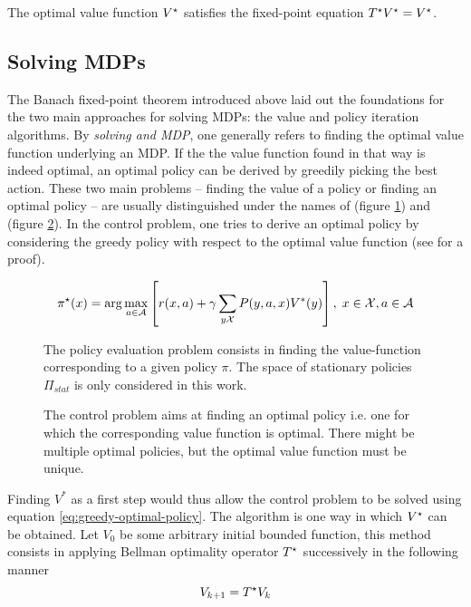 The optimal value function $V^\star$ satisfies the fixed-point equation
$T^\star V^\star = V^\star$.

\subsection{Solving MDPs}

The Banach fixed-point theorem introduced above laid out the foundations for the
two main approaches for solving MDPs: the value and policy iteration algorithms. By
\textit{solving and MDP}, one generally refers to finding the optimal value function
underlying an MDP. If the the value function found in that way is indeed optimal, an
optimal policy can be derived by greedily picking the best action. These two main
problems -- finding the value of a policy or finding an optimal policy -- are usually
distinguished under the names of  (figure \ref{fig:prediction-problem}) and  (figure \ref{fig:control-problem}). In the control
problem, one tries to derive an optimal policy by considering the greedy policy with
respect to the optimal value function (see \cite{Ross1983} for a proof).

\begin{equation}
\pi^\star(x) = \arg \max_{a \in \mathcal{A}} \left[ r(x,a) + \gamma \sum_{y
\mathcal{X}} P(y, a, x) V^*(y)\right], \; x \in
\mathcal{X}, a \in \mathcal{A} \label{eq:greedy-optimal-policy}
\end{equation}

\begin{figure}
\centering

\caption{The policy evaluation problem consists in finding the value-function
corresponding to a given policy $\pi$. The space of 
stationary policies $\Pi_{stat}$ is only considered in this work.}
\label{fig:prediction-problem}
\end{figure}

\begin{figure}
\centering

\caption{The control problem aims at finding an optimal policy i.e. one for which the
corresponding value function is optimal. There might be multiple optimal policies, but
the optimal value function must be unique\cite{Ross1983}.}
\label{fig:control-problem}
\end{figure}

Finding $V^*$ as a first step would thus allow the control problem to be solved using
equation \ref{eq:greedy-optimal-policy}. The  algorithm is
one way in which $V^\star$ can be obtained. Let $V_0$ be some arbitrary initial
bounded function, this method consists in applying Bellman optimality operator
$T^\star$ successively in the following manner
\begin{equation}
V_{k+1} = T^\star V_k \label{eq:value-iteration}
\end{equation}

